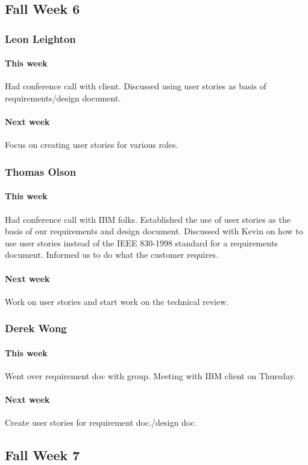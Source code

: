\documentclass[10pt,letterpaper,onecolumn,draftclsnofoot]{IEEEtran}
\begin{document}
\subsection{Fall Week 6}
\subsubsection{Leon Leighton}
\paragraph{This week} Had conference call with client. Discussed using user stories as basis of requirements/design document.
\paragraph{Next week} Focus on creating user stories for various roles.
\subsubsection{Thomas Olson}
\paragraph{This week}Had conference call with IBM folks. Established the use of user stories as the basis of our requirements and design document. Discussed with Kevin on how to use user stories instead of the IEEE 830-1998 standard for a requirements document. Informed us to do what the customer requires.
\paragraph{Next week}Work on user stories and start work on the technical review.
\subsubsection{Derek Wong}
\paragraph{This week}Went over requirement doc with group. Meeting with IBM client on Thursday.
\paragraph{Next week}Create user stories for requirement doc./design doc.

\subsection{Fall Week 7}
\end{document}
